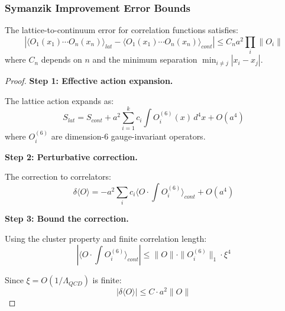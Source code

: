 \subsubsection{Symanzik Improvement Error Bounds}

\begin{theorem}
\label{thm:symanzik-error}
The lattice-to-continuum error for correlation functions satisfies:
\begin{equation}
\left| \langle O_1(x_1) \cdots O_n(x_n) \rangle_{lat} - \langle O_1(x_1) \cdots O_n(x_n) \rangle_{cont} \right| \leq C_n a^2 \prod_{i} \|O_i\|
\end{equation}
where $C_n$ depends on $n$ and the minimum separation $\min_{i \neq j}|x_i - x_j|$.
\end{theorem}

\begin{proof}
\textbf{Step 1: Effective action expansion.}

The lattice action expands as:
\begin{equation}
S_{lat} = S_{cont} + a^2 \sum_{i=1}^{k} c_i \int O_i^{(6)}(x) \, d^4x + O(a^4)
\end{equation}
where $O_i^{(6)}$ are dimension-6 gauge-invariant operators.

\textbf{Step 2: Perturbative correction.}

The correction to correlators:
\begin{equation}
\delta \langle O \rangle = -a^2 \sum_i c_i \langle O \cdot \int O_i^{(6)} \rangle_{cont} + O(a^4)
\end{equation}

\textbf{Step 3: Bound the correction.}

Using the cluster property and finite correlation length:
\begin{equation}
\left| \langle O \cdot \int O_i^{(6)} \rangle_{cont} \right| \leq \|O\| \cdot \|O_i^{(6)}\|_1 \cdot \xi^4
\end{equation}

Since $\xi = O(1/\Lambda_{QCD})$ is finite:
\begin{equation}
|\delta \langle O \rangle| \leq C \cdot a^2 \|O\|
\end{equation}
\end{proof}


